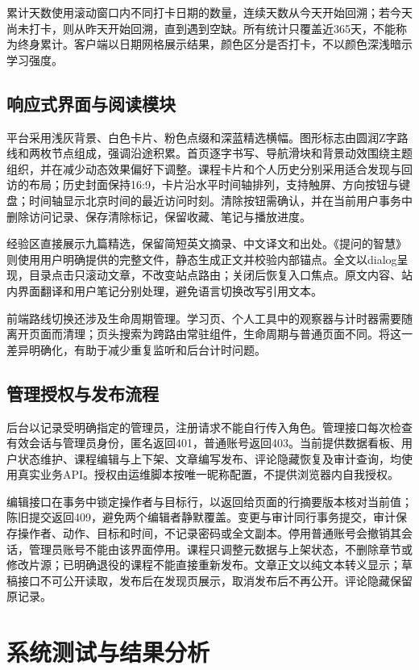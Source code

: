 \documentclass[UTF8,12pt,a4paper,oneside,openany]{ctexbook}
\begin{document}
累计天数使用滚动窗口内不同打卡日期的数量，连续天数从今天开始回溯；若今天尚未打卡，则从昨天开始回溯，直到遇到空缺。所有统计只覆盖近365天，不能称为终身累计。客户端以日期网格展示结果，颜色区分是否打卡，不以颜色深浅暗示学习强度。


\section{响应式界面与阅读模块}

平台采用浅灰背景、白色卡片、粉色点缀和深蓝精选横幅。图形标志由圆润Z字路线和两枚节点组成，强调沿途积累。首页逐字书写、导航滑块和背景动效围绕主题组织，并在减少动态效果偏好下调整。课程卡片和个人历史分别采用适合发现与回访的布局；历史封面保持16:9，卡片沿水平时间轴排列，支持触屏、方向按钮与键盘；时间轴显示北京时间的最近访问时刻。清除按钮需确认，并在当前用户事务中删除访问记录、保存清除标记，保留收藏、笔记与播放进度。


经验区直接展示九篇精选，保留简短英文摘录、中文译文和出处。《提问的智慧》则使用用户明确提供的完整文件，静态生成正文并校验内部锚点。全文以dialog呈现，目录点击只滚动文章，不改变站点路由；关闭后恢复入口焦点。原文内容、站内界面翻译和用户笔记分别处理，避免语言切换改写引用文本。


前端路线切换还涉及生命周期管理。学习页、个人工具中的观察器与计时器需要随离开页面而清理；页头搜索为跨路由常驻组件，生命周期与普通页面不同。将这一差异明确化，有助于减少重复监听和后台计时问题。


\section{管理授权与发布流程}

后台以记录受明确指定的管理员，注册请求不能自行传入角色。管理接口每次检查有效会话与管理员身份，匿名返回401，普通账号返回403。当前提供数据看板、用户状态维护、课程编辑与上下架、文章编写发布、评论隐藏恢复及审计查询，均使用真实业务API。授权由运维脚本按唯一昵称配置，不提供浏览器内自我授权。


编辑接口在事务中锁定操作者与目标行，以返回给页面的行摘要版本核对当前值；陈旧提交返回409，避免两个编辑者静默覆盖。变更与审计同行事务提交，审计保存操作者、动作、目标和时间，不记录密码或全文副本。停用普通账号会撤销其会话，管理员账号不能由该界面停用。课程只调整元数据与上架状态，不删除章节或修改片源；已明确退役的课程不能直接重新发布。文章正文以纯文本转义显示；草稿接口不可公开读取，发布后在发现页展示，取消发布后不再公开。评论隐藏保留原记录。


\chapter{系统测试与结果分析}
\end{document}
